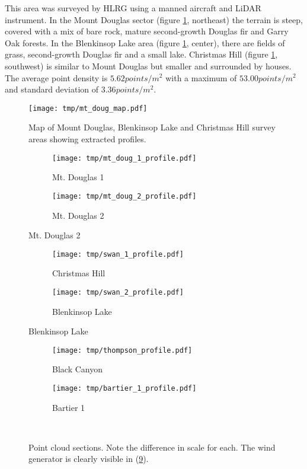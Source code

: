 \documentclass[doc]{apa6}
\begin{document}
This area was surveyed by HLRG using a manned aircraft and LiDAR instrument. In the Mount Douglas sector (figure \ref{fig:mt_doug_map}, northeast) the terrain is steep, covered with a mix of bare rock, mature second-growth Douglas fir and Garry Oak forests. In the Blenkinsop Lake area (figure \ref{fig:mt_doug_map}, center), there are fields of grass, second-growth Douglas fir and a small lake. Christmas Hill (figure \ref{fig:mt_doug_map}, southwest) is similar to Mount Douglas but smaller and surrounded by houses. The average point density is $5.62points/m^2$ with a maximum of $53.00points/m^2$ and standard deviation of $3.36points/m^2$.

\begin{figure} %
\texttt{[image: tmp/mt\_doug\_map.pdf]} 
\caption{Map of Mount Douglas, Blenkinsop Lake and Christmas Hill survey areas showing extracted profiles.}
\label{fig:mt_doug_map}
\end{figure}


\begin{figure} %
\begin{subfigure}[b]{\textwidth}
\texttt{[image: tmp/mt\_doug\_1\_profile.pdf]} 
\caption{Mt. Douglas 1} \label{subfig:mt_doug_1}
\end{subfigure}
\begin{subfigure}[b]{\textwidth}
\texttt{[image: tmp/mt\_doug\_2\_profile.pdf]} 
\caption{Mt. Douglas 2} \label{subfig:mt_doug_2}
\end{subfigure}
\end{figure}

\begin{figure}\ContinuedFloat
\begin{subfigure}[b]{\textwidth}
\texttt{[image: tmp/swan\_1\_profile.pdf]} 
\caption{Christmas Hill} \label{subfig:swan_1}
\end{subfigure}
\begin{subfigure}[b]{\textwidth}
\texttt{[image: tmp/swan\_2\_profile.pdf]} 
\caption{Blenkinsop Lake} \label{subfig:swan_2}
\end{subfigure}
\end{figure}

\begin{figure}\ContinuedFloat
\begin{subfigure}[b]{\textwidth}
\texttt{[image: tmp/thompson\_profile.pdf]} 
\caption{Black Canyon} \label{subfig:thompson}
\end{subfigure}
\begin{subfigure}[b]{\textwidth}
\texttt{[image: tmp/bartier\_1\_profile.pdf]} 
\caption{Bartier 1} \label{subfig:bartier_1}
\end{subfigure}
~
\caption{Point cloud sections. Note the difference in scale for each. The wind generator is clearly visible in (\ref{subfig:bartier_1}).}
\label{fig:profiles}
\end{figure}
\end{document}
